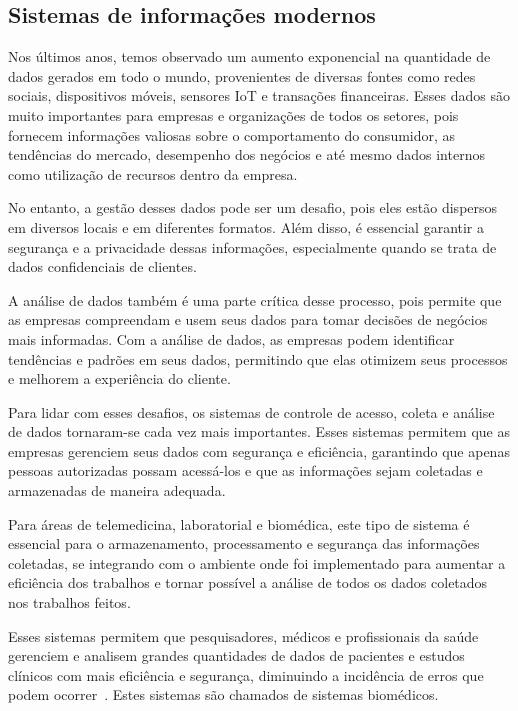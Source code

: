 \subsection{Sistemas de informações modernos}


Nos últimos anos, temos observado um aumento exponencial na quantidade de dados gerados em todo o mundo, provenientes de diversas fontes como redes sociais, dispositivos móveis, sensores IoT e transações financeiras.
Esses dados são muito importantes para empresas e organizações de todos os setores, pois fornecem informações valiosas sobre o comportamento do consumidor, as tendências do mercado, desempenho dos negócios e até mesmo dados internos como utilização de recursos dentro da empresa.

No entanto, a gestão desses dados pode ser um desafio, pois eles estão dispersos em diversos locais e em diferentes formatos. Além disso, é essencial garantir a segurança e a privacidade dessas informações, especialmente quando se trata de dados confidenciais de clientes.

A análise de dados também é uma parte crítica desse processo, pois permite que as empresas compreendam e usem seus dados para tomar decisões de negócios mais informadas. Com a análise de dados, as empresas podem identificar tendências e padrões em seus dados, permitindo que elas otimizem seus processos e melhorem a experiência do cliente.

Para lidar com esses desafios, os sistemas de controle de acesso, coleta e análise de dados tornaram-se cada vez mais importantes. Esses sistemas permitem que as empresas gerenciem seus dados com segurança e eficiência, garantindo que apenas pessoas autorizadas possam acessá-los e que as informações sejam coletadas e armazenadas de maneira adequada.

Para áreas de telemedicina, laboratorial e biomédica, este tipo de sistema é essencial para o armazenamento, processamento e segurança das informações coletadas, se integrando com o ambiente onde foi implementado para aumentar a eficiência dos trabalhos e tornar possível a análise de todos os dados coletados nos trabalhos feitos.

Esses sistemas permitem que pesquisadores, médicos e profissionais da saúde gerenciem e analisem grandes quantidades de dados de pacientes e estudos clínicos com mais eficiência e segurança, diminuindo a incidência de erros que podem ocorrer~\cite{Sun2021LaboratoryEfficiency}. Estes sistemas são chamados de sistemas biomédicos.

